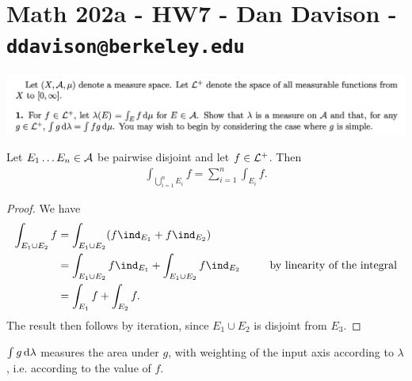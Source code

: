 \section*{Math 202a - HW7 - Dan Davison - \texttt{ddavison@berkeley.edu}}

\begin{mdframed}
\includegraphics[width=400pt]{img/analysis--berkeley-202a-hw07-9f9b.png}
\end{mdframed}

\begin{lemma}\label{lemma-finite-additivity-of-integral}
  Let $E_1 \ldots E_n \in \mathcal A$ be pairwise disjoint and let $f \in \mathcal L^+$. Then
  \begin{align*}
    \int_{\bigcup_{i=1}^n E_i} f = \sum_{i=1}^n \int_{E_i}f.
  \end{align*}
\end{lemma}

\begin{proof}
  We have
  \begin{align*}
    \int_{E_1 \cup E_2} f
    &= \int_{E_1 \cup E_2} (f\ind_{E_1} + f\ind_{E_2}) \\
    &= \int_{E_1 \cup E_2} f\ind_{E_1} + \int_{E_1 \cup E_2} f\ind_{E_2} ~~~~~~~\text{~by linearity of the integral}\\
    &= \int_{E_1} f + \int_{E_2} f.
  \end{align*}
  The result then follows by iteration, since $E_1 \cup E_2$ is disjoint from $E_3$.
\end{proof}

\begin{remark*}
  $\int g \d\lambda$ measures the area under $g$, with weighting of the input axis according to $\lambda$, i.e.
  according to the value of $f$.
\end{remark*}

